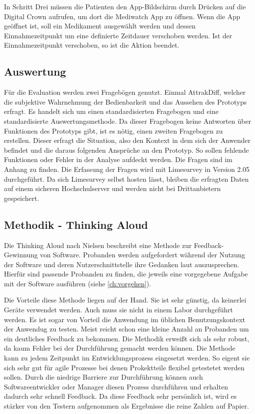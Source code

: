 In Schritt Drei müssen die Patienten den App-Bildschirm durch Drücken auf die Digital Crown aufrufen, um dort die Mediwatch App zu öffnen. Wenn die App geöffnet ist, soll ein Medikament ausgewählt werden und dessen Einnahmezeitpunkt um eine definierte Zeitdauer verschoben werden. Ist der Einnahmezeitpunkt verschoben, so ist die Aktion beendet.

\subsection{Auswertung}
Für die Evaluation werden zwei Fragebögen genutzt. Einmal AttrakDiff\cite{UserInDe:Attrakdiff}, welcher die subjektive  Wahrnehmung der Bedienbarkeit und das Aussehen des Prototyps erfragt. Es handelt sich um einen standardisierten Fragebogen und eine standardisierte Auswertungsmethode. Da dieser Fragebogen keine Antworten über Funktionen des Prototyps gibt, ist es nötig, einen zweiten Fragebogen zu erstellen. Dieser erfragt die Situation, also den Kontext in dem sich der Anwender befindet und die daraus folgenden Ansprüche an den Prototyp. So sollen fehlende Funktionen oder Fehler in der Analyse aufdeckt werden. Die Fragen sind im Anhang zu finden.
Die Erfassung der Fragen wird mit Limesurvey\cite{Limesurvey} in Version 2.05 durchgeführt. Da sich Limesurvey selbst hosten lässt, bleiben die erfragten Daten auf einem sicheren Hochschulserver und werden nicht bei Drittanbietern gespeichert. 

\subsection{Methodik - Thinking Aloud}
\label{ch:thinking}
Die Thinking Aloud nach Nielsen \cite{Nielsen:1993aa} beschreibt eine Methode zur Feedback-Gewinnung von Software. Probanden werden aufgefordert während der Nutzung der Software und deren Nutzerschnittstelle ihre Gedanken laut auszusprechen. Hierfür sind passende Probanden zu finden, die jeweils eine vorgegebene Aufgabe mit der Software ausführen (siehe \ref{ch:vorgehen}).

Die Vorteile diese Methode liegen auf der Hand. Sie ist sehr günstig, da keinerlei Geräte verwendet werden. Auch muss sie nicht in einem Labor durchgeführt werden. Es ist sogar von Vorteil die Anwendung im üblichen Benutzungskontext der Anwendug zu testen. Meist reicht schon eine kleine Anzahl an Probanden um ein deutliches Feedback zu bekommen. Die Methodik erweißt sich als sehr robust, da kaum Fehler bei der Durchführung gemacht werden können. Die Methode kann zu jedem Zeitpunkt im Entwicklungsprozess eingesetzt werden. So eigent sie sich sehr gut für agile Prozesse bei denen Prokektteile flexibel getestetet werden sollen. Durch die niedrige Barriere zur Durchführung können auch Softwareentwickler oder Manager diesen Prozess durchführen und erhalten dadurch sehr schnell Feedback. Da diese Feedback sehr persönlich ist, wird es stärker von den Testern aufgenommen als Ergebnisse die reine Zahlen auf Papier.

